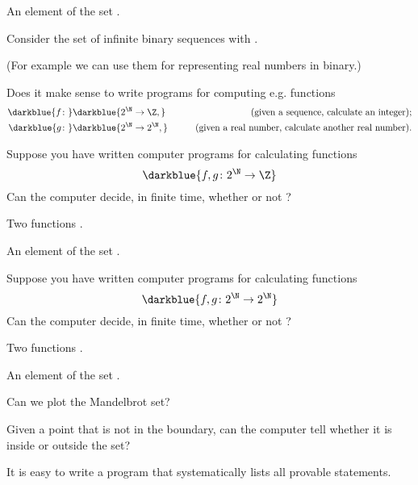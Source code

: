 \documentclass%
[%
Screen4to3,
]{foils}
\newcommand{\db}{\darkblue}
\begin{document}
 An element of the set .

\vfill


Consider the set  of infinite binary sequences \db{$x_0,x_1,x_2,\dots, x_n, \dots$} with .

(For example we can use them for representing real numbers in binary.)

\vfill

Does it make sense to write programs for computing e.g. functions
\begin{eqnarray*}
  \darkblue{f  \colon} & \darkblue{2^\N \to \Z,} & \qquad \text{(given a sequence, calculate an integer);}\\
  \darkblue{g  \colon} & \darkblue{2^\N \to 2^\N,} & \qquad \text{(given a real number, calculate another real number)}.
\end{eqnarray*}

\vfill


Suppose you have written computer programs for calculating functions
\[
\darkblue{f, g \colon 2^\N \to \Z}
\]
Can the computer decide, in finite time, whether or not ?


\vfill
{} Two functions .

 An element of the set .

\vfill


Suppose you have written computer programs for calculating functions
\[
\darkblue{f, g \colon 2^\N \to 2^\N}
\]
Can the computer decide, in finite time, whether or not ?


\vfill
{} Two functions .

 An element of the set .

\vfill


Can we plot the Mandelbrot set?

Given a point that is not in the boundary, can the computer tell
whether it is inside or outside the set?


It is easy to write a program that systematically lists all provable
statements.
\end{document}
